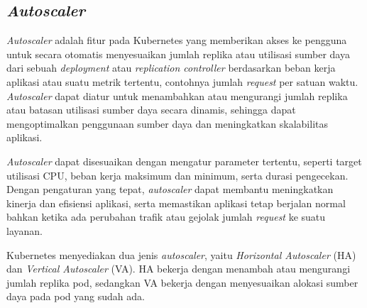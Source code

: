 \subsection{\textit{Autoscaler}}
\textit{Autoscaler} adalah fitur pada Kubernetes yang memberikan akses ke pengguna untuk secara otomatis menyesuaikan jumlah replika atau utilisasi sumber daya dari sebuah \textit{deployment} atau \textit{replication controller} berdasarkan beban kerja aplikasi atau suatu metrik tertentu, contohnya jumlah \textit{request} per satuan waktu. \textit{Autoscaler} dapat diatur untuk menambahkan atau mengurangi jumlah replika atau batasan utilisasi sumber daya secara dinamis, sehingga dapat mengoptimalkan penggunaan sumber daya dan meningkatkan skalabilitas aplikasi.

\textit{Autoscaler} dapat disesuaikan dengan mengatur parameter tertentu, seperti target utilisasi CPU, beban kerja maksimum dan minimum, serta durasi pengecekan. Dengan pengaturan yang tepat, \textit{autoscaler} dapat membantu meningkatkan kinerja dan efisiensi aplikasi, serta memastikan aplikasi tetap berjalan normal bahkan ketika ada perubahan trafik atau gejolak jumlah \textit{request} ke suatu layanan.

Kubernetes menyediakan dua jenis \textit{autoscaler}, yaitu \textit{Horizontal Autoscaler} (HA) dan \textit{Vertical Autoscaler} (VA). HA bekerja dengan menambah atau mengurangi jumlah replika pod, sedangkan VA bekerja dengan menyesuaikan alokasi sumber daya pada pod yang sudah ada.